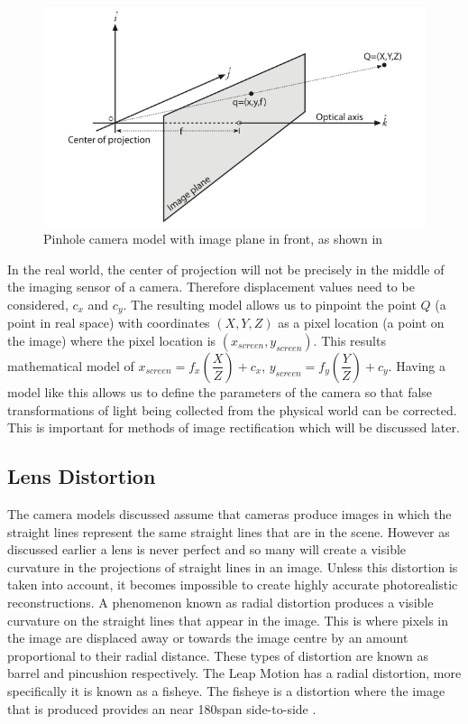 \documentclass[11pt,oneside]{report}
\begin{document}
				\begin{figure}[!ht]
				\begin{center}
					\includegraphics[scale=0.5]{pinhole2}
					\caption{Pinhole camera model with image plane in front, as shown in \protect{} {\label{fig:pinhole2}}}
				\end{center}
				\end{figure}
				In the real world, the center of projection will not be precisely in the middle of the imaging sensor of a camera.
				Therefore displacement values need to be considered, $c_{x}$ and $c_{y}$.
				The resulting model allows us to pinpoint the point $Q$ (a point in real space) with coordinates $(X,Y,Z)$ as a pixel location (a point on the image) where the pixel location is $(x_{screen}, y_{screen})$.
				This results mathematical model of $x_{screen}=f_{x}\left(\dfrac{X}{Z}\right)+c_{x}$, $y_{screen}=f_{y}\left(\dfrac{Y}{Z}\right)+c_{y}$.
				Having a model like this allows us to define the parameters of the camera so that false transformations of light being collected from the physical world can be corrected.
				This is important for methods of image rectification which will be discussed later.
				\subsection{Lens Distortion}
					The camera models discussed assume that cameras produce images in which the straight lines represent the same straight lines that are in the scene.
					However as discussed earlier a lens is never perfect and so many will create a visible curvature in the projections of straight lines in an image.
					Unless this distortion is taken into account, it becomes impossible to create highly accurate photorealistic reconstructions.
					A phenomenon known as radial distortion produces a visible curvature on the straight lines that appear in the image.
					This is where pixels in the image are displaced away or towards the image centre by an amount proportional to their radial distance.
					These types of distortion are known as barrel and pincushion respectively.
					The Leap Motion has a radial distortion, more specifically it is known as a fisheye.
					The fisheye is a distortion where the image that is produced provides an near 180\degree span side-to-side \cite{book:sam}.
					
\end{document}
